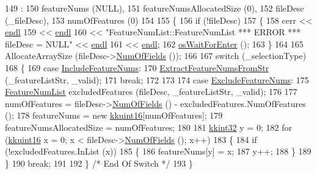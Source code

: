 \begin{DoxyCode}
149                                 :
150   featureNums              (NULL),
151   featureNumsAllocatedSize (0),
152   fileDesc                 (\_fileDesc),
153   numOfFeatures            (0)
154 
155 \{
156   \textcolor{keywordflow}{if}  (!fileDesc)
157   \{
158     cerr << \hyperlink{namespace_k_k_b_ad1f50f65af6adc8fa9e6f62d007818a8}{endl}
159          << \hyperlink{namespace_k_k_b_ad1f50f65af6adc8fa9e6f62d007818a8}{endl}
160          << \textcolor{stringliteral}{"FeatureNumList::FeatureNumList    *** ERROR ***    fileDesc = NULL"} << 
      \hyperlink{namespace_k_k_b_ad1f50f65af6adc8fa9e6f62d007818a8}{endl}
161          << \hyperlink{namespace_k_k_b_ad1f50f65af6adc8fa9e6f62d007818a8}{endl};
162     \hyperlink{namespace_k_k_b_a255aa69aade7f429585349d08973e09f}{osWaitForEnter} ();
163   \}
164 
165   AllocateArraySize (fileDesc->\hyperlink{class_k_k_m_l_l_1_1_file_desc_a07abdfb77949dee565c555c7651581c2}{NumOfFields} ());
166 
167   \textcolor{keywordflow}{switch}  (\_selectionType)
168   \{
169     \textcolor{keywordflow}{case}  \hyperlink{class_k_k_m_l_l_1_1_feature_num_list_a777e270c6cdfd3fb78618db362c718c3a2936633ed613de669864c481c9539ed4}{IncludeFeatureNums}:
170        \hyperlink{class_k_k_m_l_l_1_1_feature_num_list_a9e9f77b3707b7a1c5600f29c89349efd}{ExtractFeatureNumsFromStr} (\_featureListStr, \_valid);
171        \textcolor{keywordflow}{break};
172     
173     
174     \textcolor{keywordflow}{case}  \hyperlink{class_k_k_m_l_l_1_1_feature_num_list_a777e270c6cdfd3fb78618db362c718c3a4c4f8676af8878d1d26a2f1435e556bf}{ExcludeFeatureNums}:
175        \hyperlink{class_k_k_m_l_l_1_1_feature_num_list}{FeatureNumList}  excludedFeatures (fileDesc, \_featureListStr, \_valid);
176 
177        numOfFeatures = fileDesc->\hyperlink{class_k_k_m_l_l_1_1_file_desc_a07abdfb77949dee565c555c7651581c2}{NumOfFields} () - excludedFeatures.NumOfFeatures ();
178        featureNums = \textcolor{keyword}{new} \hyperlink{namespace_k_k_b_aa8c7d4d30381c8a0b6fce68974a9c8a9}{kkuint16}[numOfFeatures];
179        featureNumsAllocatedSize = numOfFeatures;
180 
181        \hyperlink{namespace_k_k_b_a8fa4952cc84fda1de4bec1fbdd8d5b1b}{kkint32}  y = 0;
182        \textcolor{keywordflow}{for}  (\hyperlink{namespace_k_k_b_aa8c7d4d30381c8a0b6fce68974a9c8a9}{kkuint16} x = 0; x < fileDesc->\hyperlink{class_k_k_m_l_l_1_1_file_desc_a07abdfb77949dee565c555c7651581c2}{NumOfFields} (); x++)
183        \{
184          \textcolor{keywordflow}{if}  (!excludedFeatures.InList (x))
185          \{
186            featureNums[y] = x;
187            y++;
188          \}
189        \}
190        \textcolor{keywordflow}{break};
191 
192   \}  \textcolor{comment}{/* End Of Switch */}
193 \}
\end{DoxyCode}
